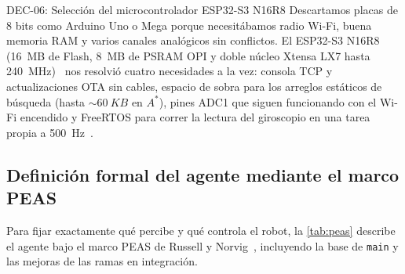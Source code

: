 \begin{decision}{DEC-06: Selección del microcontrolador ESP32-S3 N16R8}
Descartamos placas de 8 bits como Arduino Uno o Mega porque necesitábamos radio Wi-Fi, buena memoria RAM y varios canales analógicos sin conflictos. El ESP32-S3 N16R8 (\SI{16}{MB} de Flash, \SI{8}{MB} de PSRAM OPI y doble núcleo Xtensa LX7 hasta \SI{240}{MHz})~\cite{espressif2024esp32s3} nos resolvió cuatro necesidades a la vez: consola TCP y actualizaciones OTA sin cables, espacio de sobra para los arreglos estáticos de búsqueda (hasta $\sim\SI{60}{KB}$ en $A^*$), pines ADC1 que siguen funcionando con el Wi-Fi encendido y FreeRTOS para correr la lectura del giroscopio en una tarea propia a \SI{500}{Hz}~\cite{arquitectura2026doc}.
\end{decision}

\subsection{Definición formal del agente mediante el marco PEAS}
\label{subsec:peas}

Para fijar exactamente qué percibe y qué controla el robot, la \cref{tab:peas} describe el agente bajo el marco PEAS de Russell y Norvig~\cite{russell2021aima}, incluyendo la base de \texttt{main} y las mejoras de las ramas en integración.

